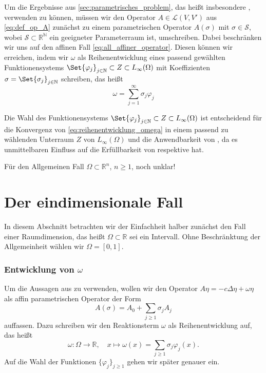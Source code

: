 Um die Ergebnisse aus \autoref{sec:parametrisches_problem}, das heißt insbesondere , verwenden zu können, müssen wir den Operator $A \in \mathcal L(V, V')$ aus \eqref{eq:def_op_A} zunächst zu einem parametrischen Operator $A(\sigma)$ mit $\sigma \in \mathcal S$, wobei $\mathcal S \subset \mathbb{R}^{\mathbb{N}}$ ein geeigneter Parameterraum ist, umschreiben.
Dabei beschränken wir uns auf den affinen Fall \eqref{eq:all_affiner_operator}.
Diesen können wir erreichen, indem wir $\omega$ als Reihenentwicklung eines passend gewählten Funktionensystems $\Set{ \varphi_{j} }_{j \in \mathbb{N}} \subset Z \subset L_{\infty}(\Omega)$ mit Koeffizienten $\sigma = \Set{\sigma_{j}}_{j \in \mathbb{N}}$ schreiben, das heißt
\begin{equation}
    \label{eq:reihenentwicklung_omega}
    \omega = \sum_{j = 1}^{\infty} \sigma_{j} \varphi_{j}
\end{equation}

Die Wahl des Funktionensystems $\Set{ \varphi_{j} }_{j \in \mathbb{N}} \subset Z \subset L_{\infty}(\Omega)$ ist entscheidend für die Konvergenz von \eqref{eq:reihenentwicklung_omega} in einem passend zu wählenden Unterraum $Z$ von $L_{\infty}(\Omega)$ und die Anwendbarkeit von , da es unmittelbaren Einfluss auf die Erfüllbarkeit von  respektive  hat.

Für den Allgemeinen Fall $\Omega \subset \mathbb{R}^{n}$, $n \geq 1$, noch unklar!


\section{Der eindimensionale Fall} %
\label{sec:der_eindimensionale_fall}

In diesem Abschnitt betrachten wir der Einfachheit halber zunächst den Fall einer Raumdimension, das heißt $\Omega \subset \mathbb{R}$ sei ein Intervall.
Ohne Beschränktung der Allgemeinheit wählen wir $\Omega = [0, 1]$.

\subsubsection{Entwicklung von $\omega$} %
\label{ssub:entwicklung_von_}

Um die Aussagen aus  zu verwenden, wollen wir den Operator $A \eta = - c \Delta \eta + \omega \eta$ als affin parametrischen Operator der Form
\begin{equation}
    \label{eq:aff_zerlegung_A}
    A(\sigma) = A_{0} + \sum_{j \geq 1} \sigma_{j} A_{j}
\end{equation}
auffassen.
Dazu schreiben wir den Reaktionsterm $\omega$ als Reihenentwicklung auf, das heißt
\begin{equation}
    \label{eq:omega_reihenentwicklung}
    \omega \colon \Omega \to \mathbb{R}, \quad x \mapsto \omega(x) = \sum_{j \geq 1} \sigma_{j} \varphi_{j}(x).
\end{equation}
Auf die Wahl der Funktionen $\{ \varphi_{j} \}_{j \geq 1}$ gehen wir später genauer ein.

